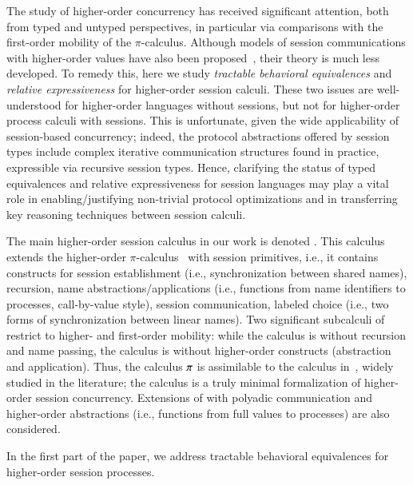 The study of higher-order concurrency has received significant attention, 
both from typed and untyped perspectives, 
in particular via 
comparisons with the first-order mobility of the $\pi$-calculus. Although models of session 
communications with higher-order values have also been proposed~\cite{Mostrous,VascoSimon},
their theory is much less developed.
To remedy this, here we study
 \emph{tractable behavioral equivalences} and \emph{relative expressiveness}
for higher-order session calculi. 
These two issues are well-understood for higher-order languages without sessions,
but not for higher-order process calculi with sessions.
This is unfortunate, given the wide applicability of session-based concurrency; indeed,
the protocol abstractions offered by 
session types include 
complex 
iterative communication structures found in practice,  expressible via recursive session types.
Hence, clarifying the status of typed equivalences and relative expressiveness for session languages
may play a vital role in enabling/justifying non-trivial protocol optimizations and in transferring key reasoning techniques between session calculi.

The main higher-order session calculus in our work is denoted \HOp.
This calculus extends the higher-order $\pi$-calculus~\cite{SangiorgiD:expmpa} with session primitives, i.e., 
it contains constructs for session establishment
(i.e., synchronization between shared names), recursion, 
name abstractions/applications (i.e., functions from name identifiers to processes, call-by-value style),
session communication, 
labeled choice (i.e., two forms of synchronization between linear names).
Two significant subcalculi of \HOp restrict to higher- and first-order mobility:
while the \HO calculus is \HOp without recursion and name passing,
the \sessp calculus is \HOp without higher-order constructs (abstraction and application).
Thus, the calculus $\pi$ is assimilable to the calculus in~\cite{HVK}, widely studied in the literature;
the \HO calculus is a truly minimal formalization of higher-order session concurrency.
Extensions of \HOp with polyadic communication and higher-order abstractions 
(i.e., functions from full values to processes) are also considered.

In the first part of the paper, we address tractable behavioral equivalences
for higher-order session processes.


